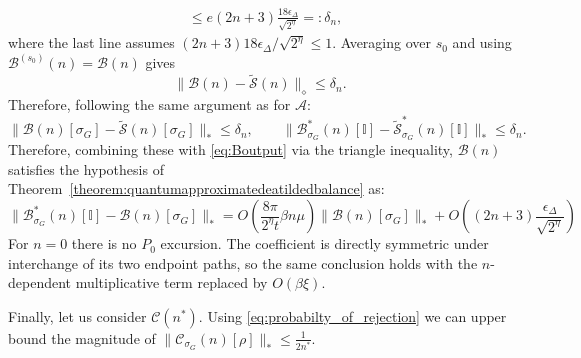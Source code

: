 \documentclass[aps,floatfix,10pt,amssymb,amsfont,amsmath,superscriptaddress,float,nofootinbib,longbibliography,nobalancelastpage,twocolumn]{revtex4-2}
\begin{document}
\begin{widetext}
\begin{align}
     &\leq e(2n+3)\frac{18\epsilon_{\Delta}}{\sqrt{2^{\eta}}}=: \delta_n,
\end{align}
where the last line assumes
$(2n+3)18\epsilon_\Delta/\sqrt{2^\eta}\leq1$.  Averaging over $s_0$ and
using $\mathcal B^{(s_0)}(n)=\mathcal B(n)$ gives
\begin{equation}
    \|\mathcal B(n)-\tilde{\mathcal S}(n)\|_\diamond\leq\delta_n.
\end{equation}
Therefore, following the same argument as for $\mathcal{A}$:
\begin{equation}
    \|\mathcal{B}(n)[\sigma_G] - \tilde{\mathcal{S}}(n)[\sigma_G]\|_* \leq \delta_n,
    \qquad \|\mathcal{B}^*_{\sigma_G}(n)[\mathbb{I}] - \tilde{\mathcal{S}}^*_{\sigma_G}(n)[\mathbb{I}]\|_* \leq \delta_n.
\end{equation}
Therefore, combining these with \eqref{eq:Boutput} via the triangle inequality, $\mathcal{B}(n)$ satisfies the hypothesis of Theorem~\ref{theorem:quantumapproximatedeatildedbalance} as:
\begin{equation}
    \|\mathcal{B}^*_{\sigma_G}(n)[\mathbb{I}] - \mathcal{B}(n)[\sigma_G]\|_* = O\left(\frac{8\pi}{2^{\eta}t}\beta n\mu\right)\|\mathcal{B}(n)[\sigma_G]\|_* +O\left((2n+3)\frac{\epsilon_{\Delta}}{\sqrt{2^{\eta}}}\right) 
\end{equation}
For $n=0$ there is no $P_0$ excursion.  The coefficient is directly
symmetric under interchange of its two endpoint paths, so the same conclusion
holds with the $n$-dependent multiplicative term replaced by $O(\beta\xi)$.

Finally, let us consider $\mathcal{C}(n^*)$. Using \eqref{eq:probabilty_of_rejection} we can upper bound the magnitude of $\|\mathcal{C}_{\sigma_G}(n)[\rho]\|_{*}\leq\frac{1}{2n^*}$.



\end{widetext}
\end{document}
